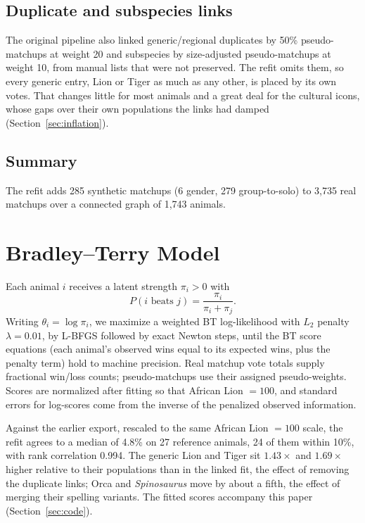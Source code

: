 \documentclass[11pt]{article}
\begin{document}
\subsection{Duplicate and subspecies links}
The original pipeline also linked generic/regional duplicates by 50\% pseudo-matchups at weight 20 and subspecies by size-adjusted pseudo-matchups at weight 10, from manual lists that were not preserved. The refit omits them, so every generic entry, Lion or Tiger as much as any other, is placed by its own votes. That changes little for most animals and a great deal for the cultural icons, whose gaps over their own populations the links had damped (Section~\ref{sec:inflation}).

\subsection{Summary}
The refit adds 285 synthetic matchups (6 gender, 279 group-to-solo) to 3,735 real matchups over a connected graph of 1,743 animals.

\section{Bradley--Terry Model}
\label{sec:bt}

Each animal $i$ receives a latent strength $\pi_i>0$ with
\begin{equation}
P(i\text{ beats }j)=\frac{\pi_i}{\pi_i+\pi_j}.
\end{equation}
Writing $\theta_i=\log\pi_i$, we maximize a weighted BT log-likelihood with $L_2$ penalty $\lambda=0.01$, by L-BFGS followed by exact Newton steps, until the BT score equations (each animal's observed wins equal to its expected wins, plus the penalty term) hold to machine precision. Real matchup vote totals supply fractional win/loss counts; pseudo-matchups use their assigned pseudo-weights. Scores are normalized after fitting so that African Lion $=100$, and standard errors for log-scores come from the inverse of the penalized observed information.

Against the earlier export, rescaled to the same African Lion $=100$ scale, the refit agrees to a median of 4.8\% on 27 reference animals, 24 of them within 10\%, with rank correlation 0.994. The generic Lion and Tiger sit $1.43\times$ and $1.69\times$ higher relative to their populations than in the linked fit, the effect of removing the duplicate links; Orca and \textit{Spinosaurus} move by about a fifth, the effect of merging their spelling variants. The fitted scores accompany this paper (Section~\ref{sec:code}).
\end{document}
